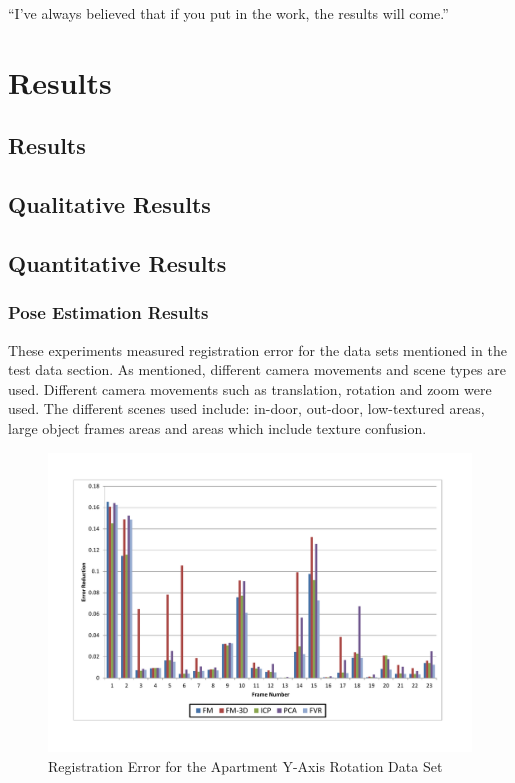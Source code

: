 \begin{savequote}[8cm]
  ``I've always believed that if you put in the work, the results will come.''
\end{savequote}
\makeatletter
\chapter{Results}

\section{Results}

\section{Qualitative Results}

\section{Quantitative Results}

\subsection{Pose Estimation Results}

These experiments measured registration error for the data sets mentioned in the test data section. As mentioned, different camera movements and scene types are used. Different camera movements such as translation, rotation and zoom were used. The different scenes used include: in-door, out-door, low-textured areas, large object frames areas and areas which include texture confusion. \\


\begin{figure}[t]
\centering
\includegraphics[width=6.0in]{images/results/Apartment_Texture_Rotate}
\caption{Registration Error for the Apartment Y-Axis Rotation Data Set}
\label{fig:PET0}
\end{figure}

